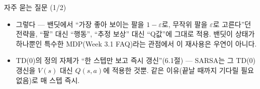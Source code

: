 \begin{frame}{자주 묻는 질문 (1/2)}
  \begin{itemize}
    \item {}
      그렇다 --- 밴딧에서 ``가장 좋아 보이는 팔을 $1-\varepsilon$로,
      무작위 팔을 $\varepsilon$로 고른다''던 전략을, ``팔'' 대신
      ``행동'', ``추정 보상'' 대신 ``Q값''에 그대로 적용.
      밴딧이 상태가 하나뿐인 특수한 MDP(Week 3.1 FAQ)라는 관점에서
      이 재사용은 우연이 아니다.
    \item {}
      TD(0)의 정의 자체가 ``한 스텝만 보고 즉시 갱신''(6.1절) ---
      SARSA는 그 TD(0) 갱신을 $V(s)$ 대신 $Q(s,a)$에 적용한 것뿐.
      같은 이유(끝날 때까지 기다릴 필요 없음)로 매 스텝 즉시.
  \end{itemize}
\end{frame}
